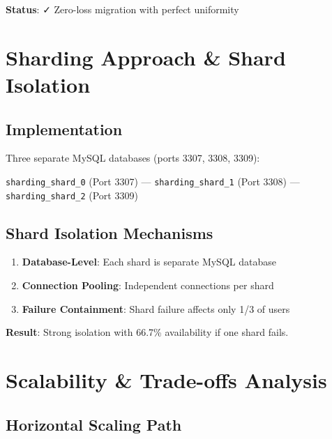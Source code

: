 \documentclass[11pt,a4paper]{article}
\begin{document}
\textbf{Status}: ✓ Zero-loss migration with perfect uniformity

\section{Sharding Approach \& Shard Isolation}

\subsection*{Implementation}

Three separate MySQL databases (ports 3307, 3308, 3309):

\texttt{sharding\_shard\_0} (Port 3307) --- \texttt{sharding\_shard\_1} (Port 3308) --- \texttt{sharding\_shard\_2} (Port 3309)

\subsection*{Shard Isolation Mechanisms}

\begin{enumerate}
    \item \textbf{Database-Level}: Each shard is separate MySQL database
    \item \textbf{Connection Pooling}: Independent connections per shard
    \item \textbf{Failure Containment}: Shard failure affects only 1/3 of users
\end{enumerate}

\textbf{Result}: Strong isolation with 66.7\% availability if one shard fails.

\section{Scalability \& Trade-offs Analysis}

\subsection*{Horizontal Scaling Path}
\end{document}
